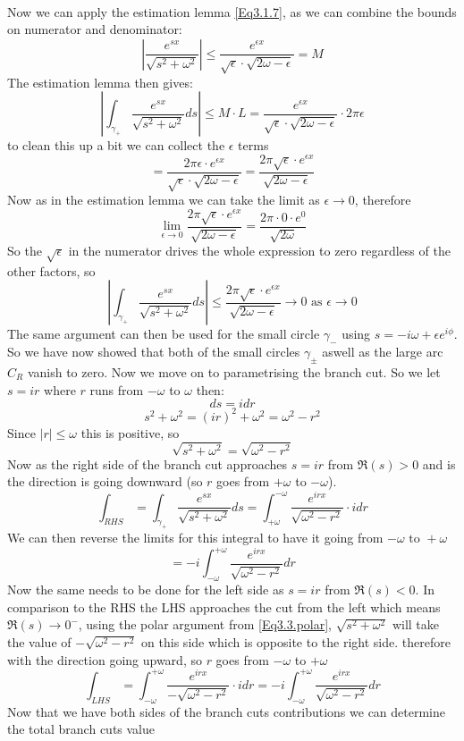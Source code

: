 \\
Now we can apply the estimation lemma \ref{Eq3.1.7}, as we can combine the bounds on numerator and denominator: 
\begin{equation}
    \left|\frac{e^{sx}}{\sqrt{s^2+\omega^2}}\right|\leq\frac{e^{\epsilon x}}{\sqrt{\epsilon}\cdot\sqrt{2\omega-\epsilon}}=M
\end{equation}
The estimation lemma then gives: $$\left|\int_{\gamma_{+}}\frac{e^{sx}}{\sqrt{s^2+\omega^2}}ds\right|\leq M\cdot L=\frac{e^{\epsilon x}}{\sqrt{\epsilon}\cdot\sqrt{2\omega-\epsilon}}\cdot2\pi\epsilon$$ to clean this up a bit we can collect the $\epsilon$ terms $$=\frac{2\pi\epsilon\cdot e^{\epsilon x}}{\sqrt{\epsilon}\cdot\sqrt{2\omega-\epsilon}}=\frac{2\pi\sqrt{\epsilon}\cdot e^{\epsilon x}}{\sqrt{2\omega-\epsilon}}$$ Now as in the estimation lemma we can take the limit as $\epsilon\to0$, therefore $$\lim_{\epsilon\to0}\frac{2\pi\sqrt{\epsilon}\cdot e^{\epsilon x}}{\sqrt{2\omega-\epsilon}}=\frac{2\pi\cdot 0 \cdot e^{0}}{\sqrt{2\omega}}$$ So the $\sqrt{\epsilon}$ in the numerator drives the whole expression to zero regardless of the other factors, so 
\begin{equation}
    \left|\int_{\gamma_{+}}\frac{e^{sx}}{\sqrt{s^2+\omega^2}}ds\right|\leq\frac{2\pi\sqrt{\epsilon}\cdot e^{\epsilon x}}{\sqrt{2\omega-\epsilon}}\to0 \text{ as } \epsilon\to0
\end{equation}
The same argument can then be used for the small circle $\gamma_{-}$ using $s=-i\omega+\epsilon e^{i\phi}$. So we have now showed that both of the small circles $\gamma_{\pm}$ aswell as the large arc $C_{R}$ vanish to zero. Now we move on to parametrising the branch cut. So we let $s=ir$ where $r$ runs from $-\omega$ to $\omega$ then: 
$$ds=idr$$ $$s^2+\omega^2=(ir)^2+\omega^2=\omega^2-r^2$$ Since $|r|\leq\omega$ this is positive, so 
\begin{equation}\label{Eq3.3.polar}
\sqrt{s^2+\omega^2}=\sqrt{\omega^2-r^2}
\end{equation}
Now as the right side of the branch cut approaches $s=ir$ from $\Re(s)>0$ and is the direction is going downward (so $r$ goes from $+\omega$ to $-\omega$). $$\int_{RHS}=\int_{\gamma_{+}}\frac{e^{sx}}{\sqrt{s^2+\omega^2}}ds=\int^{-\omega}_{+\omega}\frac{e^{irx}}{\sqrt{\omega^2-r^2}}\cdot idr$$ We can then reverse the limits for this integral to have it going from $-\omega \text{ to }+\omega$ 
\begin{equation}
    =-i\int^{+\omega}_{-\omega}\frac{e^{irx}}{\sqrt{\omega^2-r^2}}dr
\end{equation}
Now the same needs to be done for the left side as $s=ir$ from $\Re(s)<0$. In comparison to the RHS the LHS approaches the cut from the left which means $\Re(s)\to0^-$, using the polar argument from \ref{Eq3.3.polar}, $\sqrt{s^2+\omega^2}$ will take the value of $-\sqrt{\omega^2-r^2}$ on this side which is opposite to the right side. therefore with the direction going upward, so $r$ goes from $-\omega$ to $+\omega$ $$\int_{LHS}=\int_{-\omega}^{+\omega}\frac{e^{irx}}{-\sqrt{\omega^2-r^2}}\cdot idr=-i\int^{+\omega}_{-\omega}\frac{e^
{irx}}{\sqrt{\omega^2-r^2}}dr$$
Now that we have both sides of the branch cuts contributions we can determine the total branch cuts value

